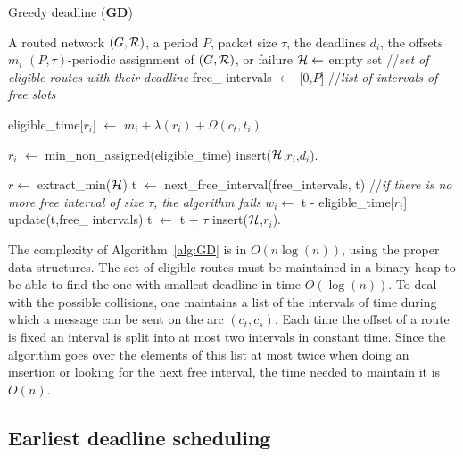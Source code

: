 \documentclass[10pt, conference, letterpaper]{IEEEtran}
\begin{document}
      \begin{algorithm}\label{alg:GD}
     \caption{ Greedy deadline ({\bf GD}) }
     \begin{algorithmic}
     \REQUIRE A routed network $(G,{\cal R})$, a period $P$, packet size $\tau$, the deadlines $d_i$, the offsets $m_i$
     \ENSURE $(P,\tau)$-periodic assignment of $(G,{\cal R})$, or failure
    \STATE  ${\cal H} \leftarrow$ empty set //{\em set of eligible routes with their deadline}
        \STATE  free\_ intervals $\leftarrow$ [0,$P$] //{\em list of intervals of free slots}
   
     \STATE  eligible\_time[$r_i$] $\leftarrow$ $m_{i} +  \lambda(r_i) + \Omega(c_t,t_i)$
       \ENDFOR
       
       \STATE $r_i$ $\leftarrow $ min\_non\_assigned(eligible\_time)
       \STATE insert(${\cal H}$,$r_i$,$d_i$).
       \ENDIF
      
       \STATE $r \leftarrow $ extract\_min(${\cal H}$)
       \STATE t $\leftarrow$ next\_free\_interval(free\_intervals, t) //{\em if there is no more free interval of size $\tau$, the algorithm fails}
       \STATE $w_i \leftarrow$ t - eligible\_time[$r_i$]
       \STATE update(t,free\_ intervals)
       \STATE t $\leftarrow$ t + $\tau$
 \STATE insert(${\cal H}$,$r_i$).
       \ENDFOR
       \ENDWHILE
     \end{algorithmic}
     \end{algorithm}


    The complexity of Algorithm~\ref{alg:GD} is in $O(n\log(n))$, using the proper data structures.
    The set of eligible routes must be maintained in a binary heap
    to be able to find the one with smallest deadline in time $O(\log(n))$. 
    To deal with the possible collisions, one maintains a list of the intervals
    of time during which a message can be sent on the arc $(c_t,c_s)$. Each time the offset of a 
    route is fixed an interval is split into at most two intervals in constant time. 
    Since the algorithm goes over the elements of this list at most twice when doing an insertion
    or looking for the next free interval, the time needed to maintain it is $O(n)$. 
  
     \subsection{Earliest deadline scheduling}\label{sec:braheuristic}
     
\end{document}
